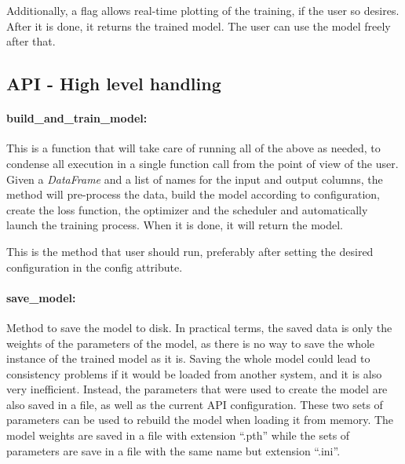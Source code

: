 \documentclass[a4paper, 11pt]{report}
\begin{document}
   Additionally, a flag allows real-time plotting of the training, if the user so desires. After it is done, it returns the trained model. The user can use the model freely after that.

   \subsection{API - High level handling}

   \paragraph{build\_and\_train\_model:} This is a function that will take care of running all of the above as needed, to condense all execution in a single function call from the point of view of the user. Given a \textit{DataFrame} and a list of names for the input and output columns, the method will pre-process the data, build the model according to configuration, create the loss function, the optimizer and the scheduler and automatically launch the training process. When it is done, it will return the model.

   This is the method that user should run, preferably after setting the desired configuration in the config attribute.

   \paragraph{save\_model:} Method to save the model to disk. In practical terms, the saved data is only the weights of the parameters of the model, as there is no way to save the whole instance of the trained model as it is. Saving the whole model could lead to consistency problems if it would be loaded from another system, and it is also very inefficient. Instead, the parameters that were used to create the model are also saved in a file, as well as the current API configuration. These two sets of parameters can be used to rebuild the model when loading it from memory. The model weights are saved in a file with extension ``.pth'' while the sets of parameters are save in a file with the same name but extension ``.ini''.
\end{document}
